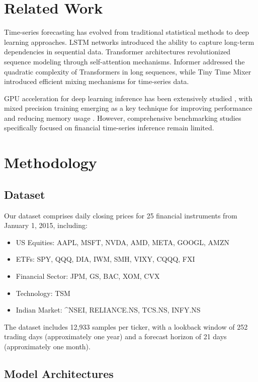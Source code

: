 \documentclass[10pt,a4paper]{article}
\begin{document}
\section{Related Work}
Time-series forecasting has evolved from traditional statistical methods to deep learning approaches. LSTM networks \cite{hochreiter1997long} introduced the ability to capture long-term dependencies in sequential data. Transformer architectures \cite{vaswani2017attention} revolutionized sequence modeling through self-attention mechanisms. Informer \cite{zhou2021informer} addressed the quadratic complexity of Transformers in long sequences, while Tiny Time Mixer \cite{ekambaram2023tiny} introduced efficient mixing mechanisms for time-series data.

GPU acceleration for deep learning inference has been extensively studied \cite{micikevicius2017mixed}, with mixed precision training emerging as a key technique for improving performance and reducing memory usage \cite{micikevicius2017mixed}. However, comprehensive benchmarking studies specifically focused on financial time-series inference remain limited.

\section{Methodology}

\subsection{Dataset}
Our dataset comprises daily closing prices for 25 financial instruments from January 1, 2015, including:
\begin{itemize}
    \item US Equities: AAPL, MSFT, NVDA, AMD, META, GOOGL, AMZN
    \item ETFs: SPY, QQQ, DIA, IWM, SMH, VIXY, CQQQ, FXI
    \item Financial Sector: JPM, GS, BAC, XOM, CVX
    \item Technology: TSM
    \item Indian Market: ^NSEI, RELIANCE.NS, TCS.NS, INFY.NS
\end{itemize}

The dataset includes 12,933 samples per ticker, with a lookback window of 252 trading days (approximately one year) and a forecast horizon of 21 days (approximately one month).

\subsection{Model Architectures}
\end{document}
